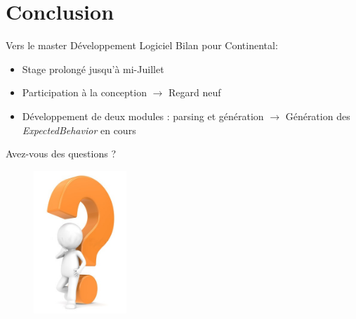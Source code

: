 \documentclass{beamer}
\begin{document}
\section*{Conclusion}
\begin{frame}{Vers le master Développement Logiciel}
		Bilan pour Continental:
	\vspace{-10px}
		\begin{itemize}[<+->]

			\item Stage prolongé jusqu'à mi-Juillet
			\item Participation à la conception $\rightarrow$ Regard neuf
			\item Développement de deux modules : parsing et génération\newline
				$\rightarrow$ Génération des \textit{ExpectedBehavior} en cours
		\end{itemize}
	\vfill
\end{frame}
\begin{frame}{Avez-vous des questions ?}
	\begin{figure}[H]
		\centering
		\includegraphics[width=3.5cm]{interrogation.jpg}
	\end{figure}
\end{frame}
\end{document}
